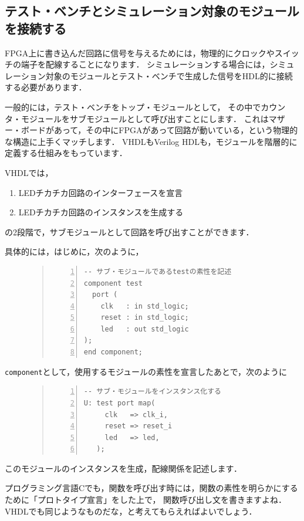 \documentclass[a4paper,dvipdfmx]{jsarticle}
\begin{document}
\subsection{テスト・ベンチとシミュレーション対象のモジュールを接続する}
FPGA上に書き込んだ回路に信号を与えるためには，物理的にクロックやスイッチの端子を配線することになります．
シミュレーションする場合には，シミュレーション対象のモジュールとテスト・ベンチで生成した信号をHDL的に接続する必要があります．

一般的には，テスト・ベンチをトップ・モジュールとして，
その中でカウンタ・モジュールをサブモジュールとして呼び出すことにします．
これはマザー・ボードがあって，その中にFPGAがあって回路が動いている，という物理的な構造に上手くマッチします．
VHDLもVerilog HDLも，モジュールを階層的に定義する仕組みをもっています．

VHDLでは，
\begin{enumerate}
 \item LEDチカチカ回路のインターフェースを宣言
 \item LEDチカチカ回路のインスタンスを生成する
\end{enumerate}
の2段階で，サブモジュールとして回路を呼び出すことができます．

具体的には，はじめに，次のように，
\begin{figure}[H]
\begin{quote}
\begin{Verbatim}[frame=single, numbers=left, baselinestretch=0.8]
-- サブ・モジュールであるtestの素性を記述
component test
  port (
    clk   : in std_logic;
    reset : in std_logic;
    led   : out std_logic
);
end component;
\end{Verbatim}
\end{quote}
\end{figure}
\verb|component|として，使用するモジュールの素性を宣言したあとで，次のように
\begin{figure}[H]
\begin{quote}
\begin{Verbatim}[frame=single, numbers=left, baselinestretch=0.8]
-- サブ・モジュールをインスタンス化する
U: test port map(
     clk   => clk_i,
     reset => reset_i
     led   => led,
   );
\end{Verbatim}
\end{quote}
\end{figure}
このモジュールのインスタンスを生成，配線関係を記述します．

プログラミング言語Cでも，関数を呼び出す時には，関数の素性を明らかにするために「プロトタイプ宣言」をした上で，
関数呼び出し文を書きますよね．VHDLでも同じようなものだな，と考えてもらえればよいでしょう．
\end{document}
